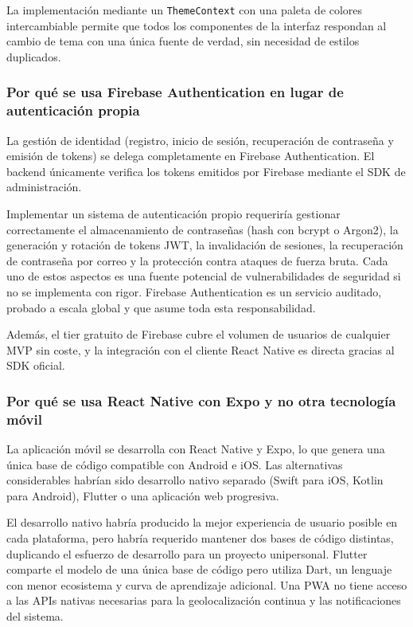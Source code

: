La implementación mediante un \texttt{ThemeContext} con una paleta de colores intercambiable permite que todos los componentes de la interfaz respondan al cambio de tema con una única fuente de verdad, sin necesidad de estilos duplicados.

\subsubsection{Por qué se usa Firebase Authentication en lugar de autenticación propia}

La gestión de identidad (registro, inicio de sesión, recuperación de contraseña y emisión de tokens) se delega completamente en Firebase Authentication. El backend únicamente verifica los tokens emitidos por Firebase mediante el SDK de administración.

Implementar un sistema de autenticación propio requeriría gestionar correctamente el almacenamiento de contraseñas (hash con bcrypt o Argon2), la generación y rotación de tokens JWT, la invalidación de sesiones, la recuperación de contraseña por correo y la protección contra ataques de fuerza bruta. Cada uno de estos aspectos es una fuente potencial de vulnerabilidades de seguridad si no se implementa con rigor. Firebase Authentication es un servicio auditado, probado a escala global y que asume toda esta responsabilidad.

Además, el tier gratuito de Firebase cubre el volumen de usuarios de cualquier MVP sin coste, y la integración con el cliente React Native es directa gracias al SDK oficial.

\subsubsection{Por qué se usa React Native con Expo y no otra tecnología móvil}

La aplicación móvil se desarrolla con React Native y Expo, lo que genera una única base de código compatible con Android e iOS. Las alternativas considerables habrían sido desarrollo nativo separado (Swift para iOS, Kotlin para Android), Flutter o una aplicación web progresiva.

El desarrollo nativo habría producido la mejor experiencia de usuario posible en cada plataforma, pero habría requerido mantener dos bases de código distintas, duplicando el esfuerzo de desarrollo para un proyecto unipersonal. Flutter comparte el modelo de una única base de código pero utiliza Dart, un lenguaje con menor ecosistema y curva de aprendizaje adicional. Una PWA no tiene acceso a las APIs nativas necesarias para la geolocalización continua y las notificaciones del sistema.

